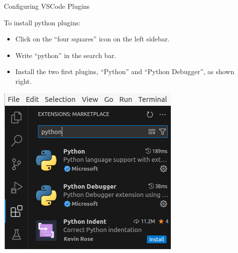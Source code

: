 \documentclass[aspectratio=169, 12pt, xcolor=table]{beamer}
\begin{document}
	\begin{frame}{Configuring VSCode Plugins}
		\begin{minipage}[t]{0.50\textwidth}
			\vspace{0pt}
			To install python plugins:
			\begin{itemize}
				\item Click on the ``four squares'' icon on the left sidebar.
				\item Write ``python'' in the search bar.
				\item Install the two first plugins, ``Python'' and ``Python Debugger'', as shown right.
			\end{itemize}
		\end{minipage}\hfill
		\begin{minipage}[t]{0.48\textwidth}
			\vspace{0pt}
			\includegraphics[width=\textwidth]{./assets/vsc_plugins.png}
		\end{minipage}
	\end{frame}
\end{document}
